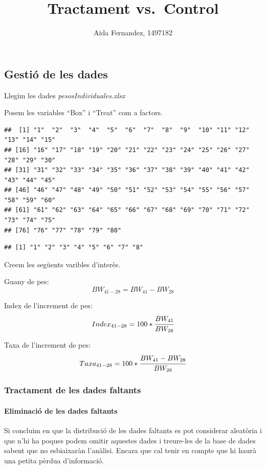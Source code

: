\documentclass[
  11pt,
]{article}
\title{Tractament vs.~Control}
\author{Aida Fernandez, 1497182}
\date{}
\begin{document}
\maketitle

\hypertarget{gestiuxf3-de-les-dades}{%
\subsection{Gestió de les dades}\label{gestiuxf3-de-les-dades}}

Llegim les dades \emph{pesosIndividuales.xlsx}

Posem les variables ``Box'' i ``Treat'' com a factors.

\begin{verbatim}
##  [1] "1"  "2"  "3"  "4"  "5"  "6"  "7"  "8"  "9"  "10" "11" "12" "13" "14" "15"
## [16] "16" "17" "18" "19" "20" "21" "22" "23" "24" "25" "26" "27" "28" "29" "30"
## [31] "31" "32" "33" "34" "35" "36" "37" "38" "39" "40" "41" "42" "43" "44" "45"
## [46] "46" "47" "48" "49" "50" "51" "52" "53" "54" "55" "56" "57" "58" "59" "60"
## [61] "61" "62" "63" "64" "65" "66" "67" "68" "69" "70" "71" "72" "73" "74" "75"
## [76] "76" "77" "78" "79" "80"
\end{verbatim}

\begin{verbatim}
## [1] "1" "2" "3" "4" "5" "6" "7" "8"
\end{verbatim}

Creem les següents varibles d'interès.

Guany de pes: \[BW_{41-28} = BW_{41} - BW_{28}\]

Index de l'increment de pes:
\[Index_{41-28} = 100*\cfrac{BW_{41}}{BW_{28}}\]

Taxa de l'increment de pes:
\[Taxa_{41-28} = 100*\cfrac{BW_{41}-BW_{28}}{BW_{28}}\]

\hypertarget{tractament-de-les-dades-faltants}{%
\subsubsection{Tractament de les dades
faltants}\label{tractament-de-les-dades-faltants}}

\hypertarget{eliminaciuxf3-de-les-dades-faltants}{%
\paragraph{Eliminació de les dades
faltants}\label{eliminaciuxf3-de-les-dades-faltants}}

Si concluim en que la distribució de les dades faltants es pot
considerar aleatòria i que n'hi ha poques podem omitir aquestes dades i
treure-les de la base de dades sabent que no esbiaixaràn l'anàlisi.
Encara que cal tenir en compte que hi haurà una petita pèrdua
d'informació.
\end{document}
